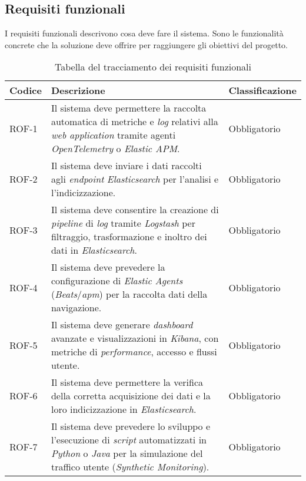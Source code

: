 \newpage
\subsection{Requisiti funzionali}
I requisiti funzionali descrivono cosa deve fare il sistema.
Sono le funzionalità concrete che la soluzione deve offrire per raggiungere gli obiettivi del progetto.

\begin{table}[h]
\caption{Tabella del tracciamento dei requisiti funzionali}
\label{tab:requisiti-funzionali}
\begin{tabularx}{\textwidth}{lXl}
\hline\hline
\textbf{Codice} & \textbf{Descrizione} & \textbf{Classificazione}\\
\hline
ROF-1     & Il sistema deve permettere la raccolta automatica di metriche e \emph{log} relativi alla \emph{web application} tramite agenti \emph{OpenTelemetry} o \emph{Elastic APM}. & Obbligatorio \\
\hline

\hline
ROF-2     & Il sistema deve inviare i dati raccolti agli \emph{endpoint} \emph{Elasticsearch} per l'analisi e l'indicizzazione. & Obbligatorio \\
\hline

\hline
ROF-3     & Il sistema deve consentire la creazione di \emph{pipeline} di \emph{log} tramite \emph{Logstash} per filtraggio, trasformazione e inoltro dei dati in \emph{Elasticsearch}. & Obbligatorio \\
\hline

\hline
ROF-4     & Il sistema deve prevedere la configurazione di \emph{Elastic Agents} (\emph{Beats}/\emph{\gls{apm}}) per la raccolta dati della navigazione. & Obbligatorio \\
\hline

\hline
ROF-5     & Il sistema deve generare \emph{dashboard} avanzate e visualizzazioni in \emph{Kibana}, con metriche di \emph{performance}, accesso e flussi utente. & Obbligatorio \\
\hline

\hline
ROF-6     & Il sistema deve permettere la verifica della corretta acquisizione dei dati e la loro indicizzazione in \emph{Elasticsearch}. & Obbligatorio \\
\hline

\hline
ROF-7     & Il sistema deve prevedere lo sviluppo e l'esecuzione di \emph{script} automatizzati in \emph{Python} o \emph{Java} per la simulazione del traffico utente (\emph{Synthetic Monitoring}). & Obbligatorio \\
\hline


\end{tabularx}
\end{table}
